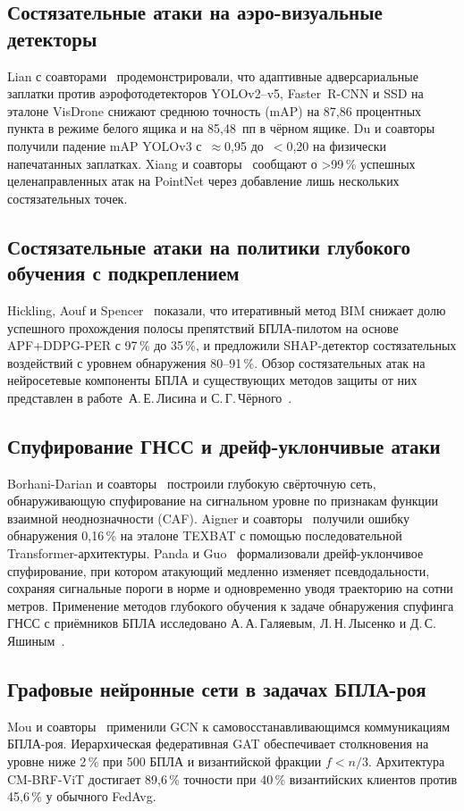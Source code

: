 \subsection{Состязательные атаки на аэро-визуальные детекторы}
Lian с соавторами~\cite{lian_2022_uav} продемонстрировали, что
адаптивные адверсариальные заплатки против аэрофотодетекторов
YOLOv2--v5, Faster~R-CNN и SSD на эталоне VisDrone снижают
среднюю точность (mAP) на 87,86 процентных пункта в режиме белого
ящика и на 85,48~пп в чёрном ящике. Du и соавторы~\cite{du_2022_uav}
получили падение mAP YOLOv3 с~$\approx$0,95 до~$<$0,20 на физически
напечатанных заплатках. Xiang и соавторы~\cite{xiang_2019_uav}
сообщают о >99\,\% успешных целенаправленных атак на PointNet через
добавление лишь нескольких состязательных точек.

\subsection{Состязательные атаки на политики глубокого обучения с
подкреплением}
Hickling, Aouf и Spencer~\cite{hickling_2023_uav} показали, что
итеративный метод BIM снижает долю успешного прохождения полосы
препятствий БПЛА-пилотом на основе APF+DDPG-PER с 97\,\% до 35\,\%,
и предложили SHAP-детектор состязательных воздействий с уровнем
обнаружения 80--91\,\%. Обзор состязательных атак на нейросетевые
компоненты БПЛА и существующих методов защиты от них представлен в
работе~А.\,Е.\,Лисина и С.\,Г.\,Чёрного~\cite{Lisin2023uav}.

\subsection{Спуфирование ГНСС и дрейф-уклончивые атаки}
Borhani-Darian и соавторы~\cite{borhani_2024_uav} построили глубокую
свёрточную сеть, обнаруживающую спуфирование на сигнальном уровне
по признакам функции взаимной неоднозначности (CAF). Aigner и
соавторы~\cite{aigner_2025_uav} получили ошибку обнаружения 0,16\,\%
на эталоне TEXBAT с помощью последовательной Transformer-архитектуры.
Panda и Guo~\cite{panda_2025_uav} формализовали дрейф-уклончивое
спуфирование, при котором атакующий медленно изменяет псевдодальности,
сохраняя сигнальные пороги в норме и одновременно уводя траекторию на
сотни метров. Применение методов глубокого обучения к задаче
обнаружения спуфинга ГНСС с приёмников БПЛА исследовано
А.\,А.\,Галяевым, Л.\,Н.\,Лысенко и Д.\,С.\,Яшиным~\cite{Galyaev2024gnss}.

\subsection{Графовые нейронные сети в задачах БПЛА-роя}
Mou и соавторы~\cite{mou_2021_uav} применили GCN к самовосстанавливающимся
коммуникациям БПЛА-роя. Иерархическая федеративная GAT
\cite{hfgat_2025_uav} обеспечивает столкновения на уровне ниже 2\,\% при
500 БПЛА и византийской фракции $f<n/3$. Архитектура CM-BRF-ViT
\cite{cmbrf_vit_2026_uav} достигает 89,6\,\% точности при 40\,\%
византийских клиентов против 45,6\,\% у обычного FedAvg.

